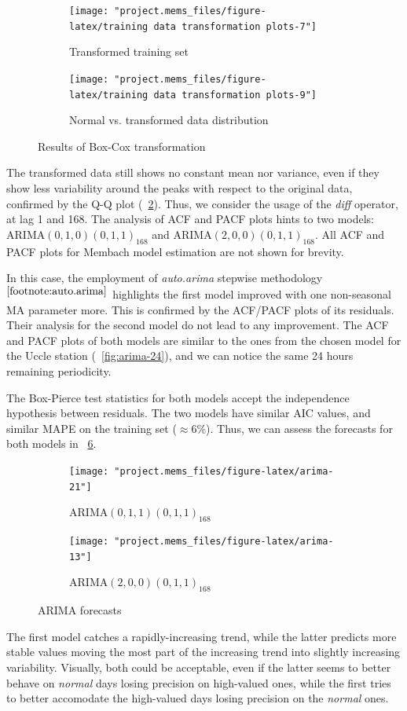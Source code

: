 \documentclass[12pt]{article}
\begin{document}
\begin{figure}[h]
	\begin{subfigure}{.5\linewidth}
		\texttt{[image: "project.mems\_files/figure-latex/training data transformation plots-7"]}
		\caption{Transformed training set}
		\label{fig:mems:box-cox:data}
	\end{subfigure}
	\begin{subfigure}{.5\linewidth}
		\texttt{[image: "project.mems\_files/figure-latex/training data transformation plots-9"]}
		\caption{Normal vs. transformed data distribution}
		\label{fig:mems:box-cox:qq}
	\end{subfigure}
	\caption{Results of Box-Cox transformation}
	\label{fig:mems:box-cox}
\end{figure}
%
The transformed data still shows no constant mean nor variance, even if they show less variability around the peaks with respect to the original data, confirmed by the Q-Q plot (\figurename~\ref{fig:mems:box-cox:qq}). Thus, we consider the usage of the \textit{diff} operator, at lag 1 and 168. The analysis of ACF and PACF plots hints to two models: $\mathrm{ARIMA}(0,1,0)(0,1,1)_{168}$ and $\mathrm{ARIMA}(2,0,0)(0,1,1)_{168}$. All ACF and PACF plots for Membach model estimation are not shown for brevity.

In this case, the employment of \textit{auto.arima} stepwise methodology$^{\ref{footnote:auto.arima}}$ highlights the first model improved with one non-seasonal MA parameter more. This is confirmed by the ACF/PACF plots of its residuals. Their analysis for the second model do not lead to any improvement.
The ACF and PACF plots of both models are similar to the ones from the chosen model for the Uccle station (\figurename~\ref{fig:arima-24}), and we can notice the same 24 hours remaining periodicity.

The Box-Pierce test statistics for both models accept the independence hypothesis between residuals. The two models have similar AIC values, and similar MAPE on the training set ($\approx6\%$). Thus, we can assess the forecasts for both models in \figurename~\ref{fig:mems:arima}.

\begin{figure}[h]
	\begin{subfigure}{.5\linewidth}
		\texttt{[image: "project.mems\_files/figure-latex/arima-21"]}
		\caption{$\mathrm{ARIMA}(0,1,1)(0,1,1)_{168}$}
		\label{fig:mems:arima:011011}
	\end{subfigure}
	\begin{subfigure}{.5\linewidth}
		\texttt{[image: "project.mems\_files/figure-latex/arima-13"]}
		\caption{$\mathrm{ARIMA}(2,0,0)(0,1,1)_{168}$}
		\label{fig:mems:arima:200011}
	\end{subfigure}
	\caption{ARIMA forecasts}
	\label{fig:mems:arima}
\end{figure}
%
The first model catches a rapidly-increasing trend, while the latter predicts more stable values moving the most part of the increasing trend into slightly increasing variability. Visually, both could be acceptable, even if the latter seems to better behave on \textit{normal} days losing precision on high-valued ones, while the first tries to better accomodate the high-valued days losing precision on the \textit{normal} ones.
\end{document}
